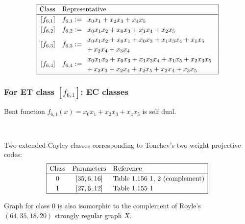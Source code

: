 \documentclass[pdf,sprung,slideColor,nocolorBG]{beamer}
\newenvironment{colortheme}[1]{
\def\ProvidesPackageRCS $##1${\relax}
\renewcommand{\ProcessOptions}{\relax}
\makeatletter

\makeatother
}{}
\begin{document}
\begin{colortheme}{jubata}
\begin{frame}
\begin{align*}
\def\arraystretch{1.2}
\begin{array}{|cl|}
\hline
\text{Class} &
\text{Representative}
\\
\hline
\,[f_{6,1}] & f_{6,1} :=
\begin{array}{l}
x_{0} x_{1} + x_{2} x_{3} + x_{4} x_{5}
\end{array}
\\
\,[f_{6,2}] & f_{6,2} :=
\begin{array}{l}
x_{0} x_{1} x_{2} + x_{0} x_{3} + x_{1} x_{4} + x_{2} x_{5}
\end{array}
\\
\,[f_{6,3}] & f_{6,3} :=
\begin{array}{l}
x_{0} x_{1} x_{2} + x_{0} x_{1} + x_{0} x_{3} + x_{1} x_{3} x_{4} + x_{1} x_{5}
\\
 +\, x_{2} x_{4} + x_{3} x_{4}
\end{array}
\\
\,[f_{6,4}] & f_{6,4} :=
\begin{array}{l}
x_{0} x_{1} x_{2} + x_{0} x_{3} + x_{1} x_{3} x_{4} + x_{1} x_{5} + x_{2} x_{3} x_{5}
\\
 +\, x_{2} x_{3} + x_{2} x_{4} + x_{2} x_{5} + x_{3} x_{4} + x_{3} x_{5}
\end{array}
\\
\hline
\end{array}
\end{align*}
\end{frame}
\begin{frame}
\frametitle{For ET class $[f_{6,1}]$: EC classes}

Bent function
$f_{6,1}(x) = x_0 x_1 + x_2 x_3 + x_4 x_5$ is self dual.

 ~

Two extended Cayley classes corresponding to Tonchev's two-weight projective codes:
\begin{align*}
\def\arraystretch{1.2}
\begin{array}{|ccl|}
\hline
\text{Class} &
\text{Parameters} & \text{Reference}
\\
\hline
0 & [35,6,16] & \text{Table 1.156 1, 2 (complement)}
\\
1 & [27,6,12] & \text{Table 1.155 1 }
\\
\hline
\end{array}
\end{align*}

Graph for class 0 is also isomorphic to the complement of Royle's $(64,35,18,20)$ strongly regular
graph $X$.


\end{frame}
\end{colortheme}
\end{document}
